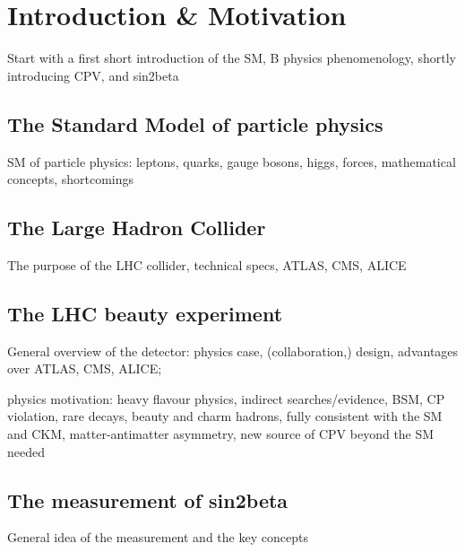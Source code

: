 
\chapter{Introduction \& Motivation}
Start with a first short introduction of the SM, B physics phenomenology, shortly introducing CPV, and sin2beta

\section{The Standard Model of particle physics}
SM of particle physics: leptons, quarks, gauge bosons, higgs, forces, mathematical concepts, shortcomings 

\section{The Large Hadron Collider}
The purpose of the LHC collider, technical specs, ATLAS, CMS, ALICE

\section{The LHC beauty experiment}
General overview of the detector: physics case, (collaboration,) design, advantages over ATLAS, CMS, ALICE; 

physics motivation:
heavy flavour physics, indirect searches/evidence, BSM, CP violation, rare decays, beauty and charm hadrons, fully consistent with the SM and CKM, matter-antimatter asymmetry, new source of CPV beyond the SM needed

\section{The measurement of sin2beta}
General idea of the measurement and the key concepts
